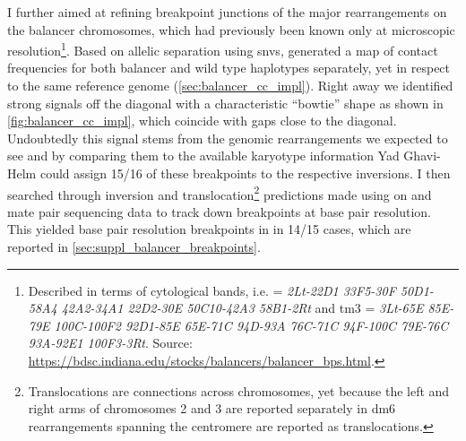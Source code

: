 I further aimed at refining breakpoint junctions of the major rearrangements on
the balancer chromosomes, which had previously been known only at microscopic
resolution\footnote{\label{footnote:balancer_karyotype}
    Described in terms of cytological bands, i.e. \cyo = \textit{2Lt-22D1
    33F5-30F 50D1-58A4 42A2-34A1 22D2-30E 50C10-42A3 58B1-2Rt} and
    \ac{tm3} = \textit{3Lt-65E 85E-79E 100C-100F2 92D1-85E 65E-71C
    94D-93A 76C-71C 94F-100C 79E-76C 93A-92E1 100F3-3Rt}.
    Source: \url{https://bdsc.indiana.edu/stocks/balancers/balancer_bps.html}.}.
Based on allelic separation using \acp{snv}, \alek generated a \hic map of
contact frequencies for both balancer and wild type haplotypes separately, yet
in respect to the same reference genome (\cref{sec:balancer_cc_impl}).
Right away we identified strong signals off the diagonal with a characteristic
``bowtie'' shape as shown in \cref{fig:balancer_cc_impl}, which coincide with
gaps close to the diagonal. Undoubtedly this signal stems from the genomic
rearrangements we expected to see and by comparing them to the available
karyotype information Yad Ghavi-Helm could assign 15/16 of these breakpoints to
the respective inversions. I then searched through inversion and
translocation\footnote{Translocations are connections across chromosomes, yet
    because the left and right arms of chromosomes 2 and 3 are reported
    separately in \ac{dm6} rearrangements spanning the centromere are reported
    as translocations.}
predictions made using \delly on \wgs and mate pair sequencing data to
track down breakpoints at base pair resolution. This yielded base pair
resolution breakpoints in in 14/15 cases, which are reported in
\cref{sec:suppl_balancer_breakpoints}.


